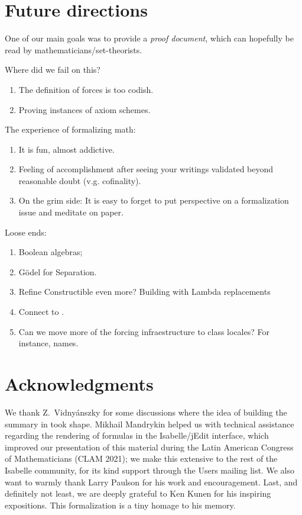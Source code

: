 \section{Future directions}
\label{sec:conclusion}

One of our main goals was to provide a \emph{proof document}, which
can hopefully be read by mathematicians/set-theorists.

Where did we fail on this?
\begin{enumerate}
\item
  The definition of forces is too codish.
\item
  Proving instances of axiom schemes.
\end{enumerate}

The experience of formalizing math:
\begin{enumerate}
\item It is fun, almost addictive.
\item Feeling of accomplishment after seeing your writings
  validated beyond reasonable doubt (v.g. cofinality).
\item On the grim side: It is easy to forget to put perspective on a
  formalization issue and meditate on paper.
\end{enumerate}

Loose ends:
\begin{enumerate}
\item
  Boolean algebras;
\item
  Gödel for Separation.
\item
  Refine Constructible even more? Building with Lambda replacements
\item
  Connect to .
\item
  Can we move more of the forcing infraestructure to class locales?
  For instance, names.
\end{enumerate}

\section*{Acknowledgments}
\label{sec:acknowledgments}
We thank Z.~Vidnyánszky for some discussions where the idea of
building the summary in  took shape.
Mikhail Mandrykin helped us with technical assistance regarding the
rendering of formulas in the Isabelle/jEdit interface, which improved
our presentation of this material during the Latin American Congress
of Mathematicians (CLAM 2021); we make this extensive to the rest of
the Isabelle community, for its kind support through the Users mailing
list. We also want to warmly thank Larry Paulson for his work and
encouragement.  Last, and definitely not least, we are deeply grateful
to Ken Kunen for his
inspiring expositions. This formalization is a tiny homage to his
memory.


